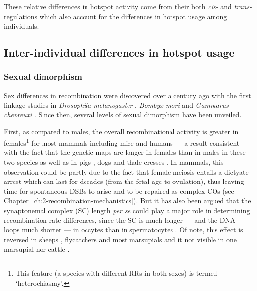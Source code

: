 These relative differences in hotspot activity come from their both \textit{cis-} and \textit{trans-} regulations \citep[reviewed in][]{paigen2010mammalian} which also account for the differences in hotspot usage among individuals.



\subsection{Inter-individual differences in hotspot usage}

\subsubsection{Sexual dimorphism}

Sex differences in recombination were discovered over a century ago with the first linkage studies in \textit{Drosophila melanogaster} \citep{morgan1912complete,morgan1914no}, \textit{Bombyx mori} \citep{takanaytianzhong1914sexualWITHJAP} and \textit{Gammarus chevreuxi} \citep{huxley1928sexual}. 
Since then, several levels of sexual dimorphism have been unveiled.

First, as compared to males, the overall recombinational activity is greater in females\footnote{This feature (a species with different RRs in both sexes) is termed ‘heterochiasmy’.} for most mammals \citep{dunn1967sex} including mice \citep{shifman2006highresolution} and humans \citep{donis-keller1987genetic,broman1998comprehensive} — a result consistent with the fact that the genetic maps are longer in females than in males in these two species \citep{lynn2004variation,cox2009new} as well as in pigs \citep{mikawa1999linkage}, dogs \citep{neff1999secondgeneration} and thale cresses \citep{drouaud2007sexspecific}. 
In mammals, this observation could be partly due to the fact that female meiosis entails a dictyate arrest which can last for decades (from the fetal age to ovulation), thus leaving time for spontaneous DSBs to arise and to be repaired as complex COs (see Chapter~\ref{ch:2-recombination-mechanistics}).
But it has also been argued that the synaptonemal complex (SC) length \textit{per se} could play a major role in determining recombination rate differences, since the SC is much longer — and the DNA loops much shorter — in occytes than in spermatocytes \citep{tease2004intersex}.
Of note, this effect is reversed in sheeps \citep{maddox2001enhanced}, flycatchers \citep{backstrom2008genebased} and most marsupials \citep{bennett1986novel,hayman1988further,hayman1990meiosis} and it not visible in one marsupial \citep{hayman1990comparative} nor cattle \citep{kappes1997secondgeneration}.

